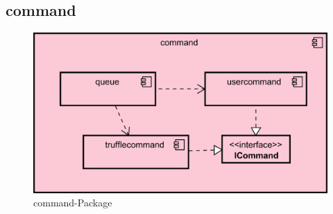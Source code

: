 \subsection{command}
\label{subsec:command}

\begin{figure}[H]
  \centering
  \includegraphics[width=\textwidth]{../diagramimages/command.png}
  \caption{command-Package}
\end{figure}

